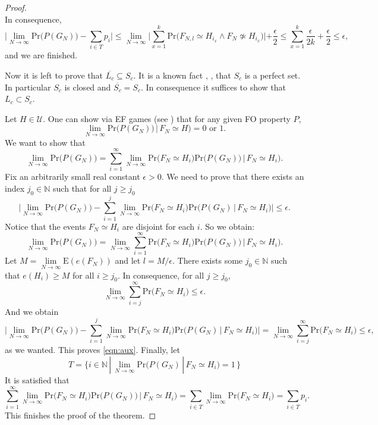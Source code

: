 \documentclass[11pt,notitlepage,a4paper]{article}
\theoremstyle{definition}
\newcommand{\N}{\mathbb{N}}
\newcommand{\LN}{\lim\limits_{N\to \infty}}
\begin{document}
\begin{proof}
\[	\]
	In consequence,
	\[
	\big|\LN \mathrm{Pr}\big(P(G_N)\big)- \sum_{i\in T}p_i \big|
	\leq
	\LN	\big|\sum_{x=1}^{k} \mathrm{Pr}\big( F_{N,l}
	\simeq H_{i_x} \wedge 
	F_N\not\simeq H_{i_x} \big)|
	+ \frac{\epsilon}{2}\leq
	\sum_{x=1}^{k} \frac{\epsilon}{2k} + \frac{\epsilon}{2}
	\leq \epsilon,
	\]
	and we are finished. \par
	Now it is left to prove that
	$\overline{L_c}\subseteq S_c$. 
	It is a known fact \cite{kakeya1914partial}, 
	\cite{hornich1941beliebige}, \cite{nymann2000paper}
	that $S_c$ is a perfect set. In particular
	$S_c$ is closed and $\overline{S_c}=S_c$. In
	consequence it suffices to show that
	$L_c\subset S_c$.\par
	Let $H\in \mathcal{U}$.
	One can show via EF games (see \cite{mastertesisalberto}) 
	that for any given FO property $P$,
 	\[
 	\LN \mathrm{Pr}\big( P(G_N)) \, | \, F_N\simeq H \big)
 	= 0 \text{ or } 1.
 	\]
 	We want to show that 
 	\begin{equation}\label{eqn:aux}
 	\LN \mathrm{Pr}\big( P(G_N) \big)
 	= \sum_{i=1}^\infty \LN \mathrm{Pr}\big( F_N \simeq H_i \big)
 	\mathrm{Pr}\big( P(G_N)) \, | \, F_N\simeq H_i \big).
 	\end{equation}
 	Fix an arbitrarily small real constant $\epsilon>0$. We
 	need to prove that there exists an index $j_0\in \N$ such
 	that for all $j\geq j_0$
 	\[
 	\big|\LN \mathrm{Pr}\big( P(G_N) \big) -
 	\sum_{i=1}^j \LN \mathrm{Pr}\big( F_N \simeq H_i \big)
 	\mathrm{Pr}\big( P(G_N) \, | \, F_N\simeq H_i \big)\big|\leq 
 	\epsilon.
 	\]
	Notice that the events $F_N\simeq H_i$ are disjoint for each
	$i$. So we obtain:
	\[
	\LN \mathrm{Pr}\big( P(G_N)\big)=
	\LN \sum_{i=1}^\infty \mathrm{Pr}\big( F_N \simeq H_i \big)
	\mathrm{Pr}\big( P(G_N)) \, | \, F_N\simeq H_i \big).	
	\] 
	Let $M=\LN \mathrm{E}(e(F_N))$ and let $l=M/\epsilon$.
	There exists some $j_0\in \N$ such that $e(H_i)\geq M$ 
	for all $i\geq j_0$. In consequence, for all $j\geq j_0$,
	\[
	\LN \sum_{i=j}^{\infty} \mathrm{Pr}\big( F_N \simeq H_i \big) \leq 
	\epsilon.	
	\]
	And we obtain
	\[
	\big|\LN \mathrm{Pr}\big( P(G_N) \big) -
	\sum_{i=1}^j \LN \mathrm{Pr}\big( F_N \simeq H_i \big)
	\mathrm{Pr}\big( P(G_N) \, | \, F_N\simeq H_i \big)\big|=
	\LN \sum_{i=j}^{\infty} \mathrm{Pr}\big( F_N \simeq H_i \big) \leq 
	\epsilon,
	\]
	as we wanted. This proves \cref{eqn:aux}. Finally, let 
	\[
	T=\{i\in \N \, | \, \LN \mathrm{Pr}
	\big( P(G_N) \, | \, F_N\simeq H_i \big) = 1 \,	
	\}
	\]
	It is satisfied that 
	\[
	\sum_{i=1}^\infty \LN \mathrm{Pr}\big( F_N \simeq H_i \big)
	\mathrm{Pr}\big( P(G_N)) \, | \, F_N\simeq H_i \big)=
	\sum_{i\in T} \LN \mathrm{Pr}\big( F_N \simeq H_i \big)
	= \sum_{i\in T} p_i.
	\]
	This finishes the proof of the theorem.  
\end{proof}





\end{document}
